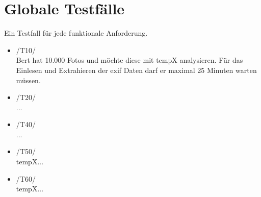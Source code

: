 \section{Globale Testfälle}

Ein Testfall für jede funktionale Anforderung.

\begin{itemize}
	\item /T10/\\Bert hat 10.000 Fotos und möchte diese mit \gls{tempX} analysieren. Für das Einlesen und Extrahieren der \gls{exif} Daten darf er maximal 25 Minuten warten müssen.
	\item /T20/\\ ...
	\item /T40/\\ ...
	\item /T50/\\ \gls{tempX}...
	\item /T60/\\ \gls{tempX}...
\end{itemize}